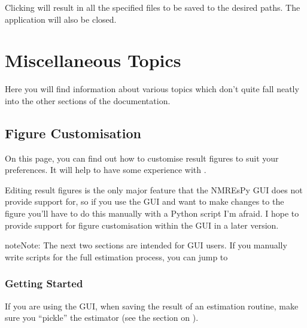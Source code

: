 \documentclass[letterpaper,10pt,english]{sphinxmanual}
\begin{document}
\sphinxAtStartPar
Clicking  will result in all the specified files to be saved to the desired
paths. The application will also be closed.





\chapter{Miscellaneous Topics}
\label{\detokenize{misc/index:miscellaneous-topics}}\label{\detokenize{misc/index::doc}}
\sphinxAtStartPar
Here you will find information about various topics which don’t quite fall
neatly into the other sections of the documentation.




\section{Figure Customisation}
\label{\detokenize{misc/figure_customisation:figure-customisation}}\label{\detokenize{misc/figure_customisation::doc}}
\sphinxAtStartPar
On this page, you can find out how to customise result figures to suit your
preferences. It will help to have some experience with
.

\sphinxAtStartPar
Editing result figures is the only major feature that the NMR\sphinxhyphen{}EsPy GUI does
not provide support for, so if you use the GUI and want to make changes to the
figure you’ll have to do this manually with a Python script I’m afraid. I hope
to provide support for figure customisation within the GUI in a later version.

\begin{sphinxadmonition}{note}{Note:}
\sphinxAtStartPar
The next two sections are intended for GUI users. If you manually write
scripts for the full estimation process, you can jump to
{\hyperref[\detokenize{misc/figure_customisation:generate-the-estimation-figure}]{}}
\end{sphinxadmonition}


\subsection{Getting Started}
\label{\detokenize{misc/figure_customisation:getting-started}}
\sphinxAtStartPar
If you are using the GUI, when saving the result of an estimation routine, make
sure you “pickle” the estimator (see the section  on
{\hyperref[\detokenize{gui/usage/result::doc}]{}}).
\end{document}
